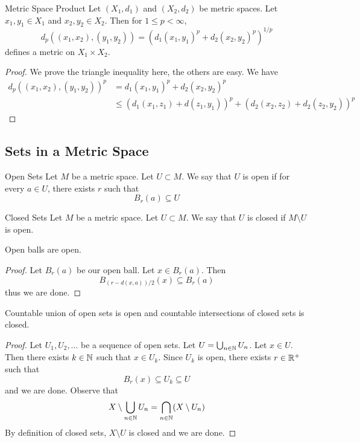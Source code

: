 \documentclass[a4paper]{article}
\begin{document}
\begin{prp}{Metric Space Product}{} Let $(X_1,d_1)$ and $(X_2,d_2)$ be metric spaces. Let $x_1,y_1\in X_1$ and $x_2,y_2\in X_2$. Then for $1\leq p<\infty$, $$d_p((x_1,x_2),(y_1,y_2))=(d_1(x_1,y_1)^p+d_2(x_2,y_2)^p)^{1/p}$$ defines a metric on $X_1\times X_2$. \tcbline
\begin{proof}
We prove the triangle inequality here, the others are easy. We have
\begin{align*}
d_p((x_1,x_2),(y_1,y_2))^p&=d_1(x_1,y_1)^p+d_2(x_2,y_2)^p\\
&\leq(d_1(x_1,z_1)+d(z_1,y_1))^p+(d_2(x_2,z_2)+d_2(z_2,y_2))^p
\end{align*}
\end{proof}
\end{prp}

\subsection{Sets in a Metric Space}
\begin{defn}{Open Sets}{} Let $M$ be a metric space. Let $U\subset M$. We say that $U$ is open if for every $a\in U$, there exists $r$ such that $$B_r(a)\subseteq U$$
\end{defn}

\begin{defn}{Closed Sets}{} Let $M$ be a metric space. Let $U\subset M$. We say that $U$ is closed if $M\setminus U$ is open. 
\end{defn}

\begin{lmm}{}{} Open balls are open. \tcbline
\begin{proof} Let $B_r(a)$ be our open ball. Let $x\in B_r(a)$. Then $$B_{(r-d(x,a))/2}(x)\subseteq B_r(a)$$ thus we are done. 
\end{proof}
\end{lmm}

\begin{prp}{}{} Countable union of open sets is open and countable intersections of closed sets is closed. \tcbline
\begin{proof} Let $U_1,U_2,\dots$ be a sequence of open sets. Let $U=\bigcup_{n\in\mathbb{N}}U_n$. Let $x\in U$. Then there exists $k\in\mathbb{N}$ such that $x\in U_k$. Since $U_k$ is open, there exists $r\in\mathbb{R}^+$ such that $$B_r(x)\subseteq U_k\subseteq U$$ and we are done. \linebreak\linebreak
Observe that $$X\setminus\bigcup_{n\in\mathbb{N}}U_n=\bigcap_{n\in\mathbb{N}}(X\setminus U_n)$$ By definition of closed sets, $X\setminus U$ is closed and we are done. 
\end{proof}
\end{prp}
\end{document}
